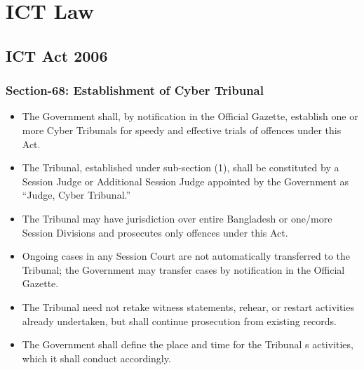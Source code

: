 \chapter{ICT Law}

\section{ICT Act 2006}

\subsection{Section-68: Establishment of Cyber Tribunal}
\begin{itemize}[parsep=0.5em]
	\item	The Government shall, by notification in the Official Gazette, establish one or more Cyber Tribunals for speedy and effective trials of offences under this Act.
	\item	The Tribunal,
	established under sub-section (1),
   shall be constituted by a Session Judge or Additional Session Judge appointed by the Government as “Judge, Cyber Tribunal.”
	\item	The Tribunal may have jurisdiction over entire Bangladesh or one/more Session Divisions and prosecutes only offences under this Act.
	\item	Ongoing cases in any Session Court are not automatically transferred to the Tribunal; the Government may transfer cases by notification in the Official Gazette.
	\item	The Tribunal need not retake witness statements, rehear, or restart activities already undertaken, but shall continue prosecution from existing records.
	\item	The Government shall define the place and time for the Tribunal
   s activities, which it shall conduct accordingly.
\end{itemize}


